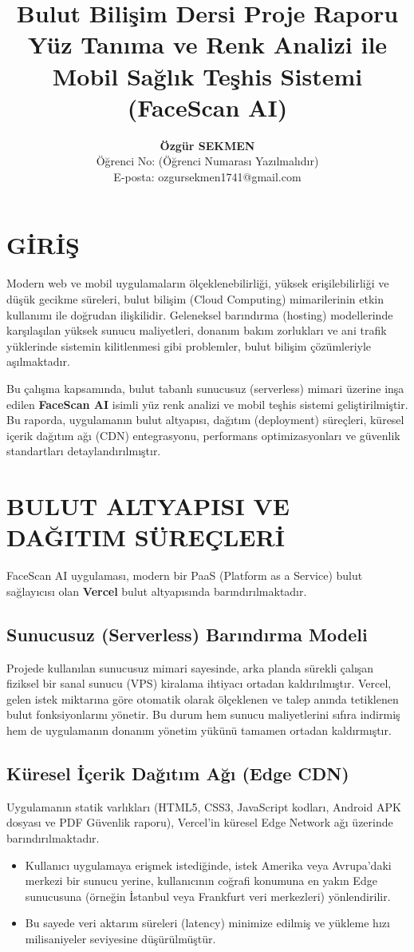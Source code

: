 \documentclass[12pt,a4paper]{article}
\title{\textbf{Bulut Bilişim Dersi Proje Raporu \\ Yüz Tanıma ve Renk Analizi ile Mobil Sağlık Teşhis Sistemi (FaceScan AI)}}
\author{\textbf{Özgür SEKMEN} \\ Öğrenci No: (Öğrenci Numarası Yazılmalıdır) \\ E-posta: ozgursekmen1741@gmail.com}
\date{\the\year}
\begin{document}
\maketitle
\thispagestyle{empty}
\newpage
{}

\section{GİRİŞ}
Modern web ve mobil uygulamaların ölçeklenebilirliği, yüksek erişilebilirliği ve düşük gecikme süreleri, bulut bilişim (Cloud Computing) mimarilerinin etkin kullanımı ile doğrudan ilişkilidir. Geleneksel barındırma (hosting) modellerinde karşılaşılan yüksek sunucu maliyetleri, donanım bakım zorlukları ve ani trafik yüklerinde sistemin kilitlenmesi gibi problemler, bulut bilişim çözümleriyle aşılmaktadır.

Bu çalışma kapsamında, bulut tabanlı sunucusuz (serverless) mimari üzerine inşa edilen \textbf{FaceScan AI} isimli yüz renk analizi ve mobil teşhis sistemi geliştirilmiştir. Bu raporda, uygulamanın bulut altyapısı, dağıtım (deployment) süreçleri, küresel içerik dağıtım ağı (CDN) entegrasyonu, performans optimizasyonları ve güvenlik standartları detaylandırılmıştır.

\section{BULUT ALTYAPISI VE DAĞITIM SÜREÇLERİ}
FaceScan AI uygulaması, modern bir PaaS (Platform as a Service) bulut sağlayıcısı olan \textbf{Vercel} bulut altyapısında barındırılmaktadır. 

\subsection{Sunucusuz (Serverless) Barındırma Modeli}
Projede kullanılan sunucusuz mimari sayesinde, arka planda sürekli çalışan fiziksel bir sanal sunucu (VPS) kiralama ihtiyacı ortadan kaldırılmıştır. Vercel, gelen istek miktarına göre otomatik olarak ölçeklenen ve talep anında tetiklenen bulut fonksiyonlarını yönetir. Bu durum hem sunucu maliyetlerini sıfıra indirmiş hem de uygulamanın donanım yönetim yükünü tamamen ortadan kaldırmıştır.

\subsection{Küresel İçerik Dağıtım Ağı (Edge CDN)}
Uygulamanın statik varlıkları (HTML5, CSS3, JavaScript kodları, Android APK dosyası ve PDF Güvenlik raporu), Vercel'in küresel Edge Network ağı üzerinde barındırılmaktadır. 
\begin{itemize}
    \item Kullanıcı uygulamaya erişmek istediğinde, istek Amerika veya Avrupa'daki merkezi bir sunucu yerine, kullanıcının coğrafi konumuna en yakın Edge sunucusuna (örneğin İstanbul veya Frankfurt veri merkezleri) yönlendirilir.
    \item Bu sayede veri aktarım süreleri (latency) minimize edilmiş ve yükleme hızı milisaniyeler seviyesine düşürülmüştür.
\end{itemize}
\end{document}
